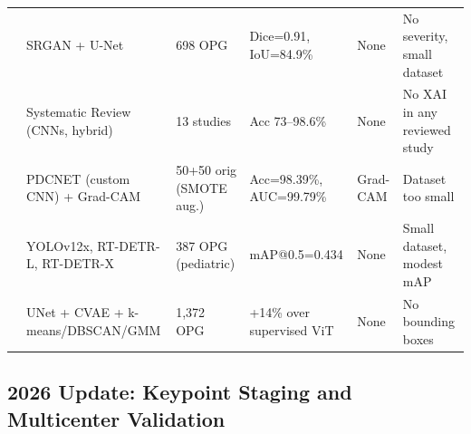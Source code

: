 \documentclass[conference]{IEEEtran}
\begin{document}
\begin{table}[t]
\begin{tabular}{p{0.6cm} p{4.5cm} p{3.0cm} p{3.8cm} p{1.0cm} p{2.8cm}}
\cite{kong2024integrating}   & SRGAN + U-Net & 698 OPG & Dice=0.91, IoU=84.9\% & None & No severity, small dataset \\
\cite{ferrara2025applications}& Systematic Review (CNNs, hybrid) & 13 studies & Acc 73--98.6\% & None & No XAI in any reviewed study \\
\cite{bilal2024pdcnet}       & PDCNET (custom CNN) + Grad-CAM & 50+50 orig (SMOTE aug.) & Acc=98.39\%, AUC=99.79\% & Grad-CAM & Dataset too small \\
\cite{karamuftuo2025panoramic} & YOLOv12x, RT-DETR-L, RT-DETR-X & 387 OPG (pediatric) & mAP@0.5=0.434 & None & Small dataset, modest mAP \\
\cite{kim2024unsupervised}   & UNet + CVAE + k-means/DBSCAN/GMM & 1,372 OPG & +14\% over supervised ViT & None & No bounding boxes \\
\bottomrule
\end{tabular}
\end{table}

\subsection{2026 Update: Keypoint Staging and Multicenter Validation}
\end{document}
